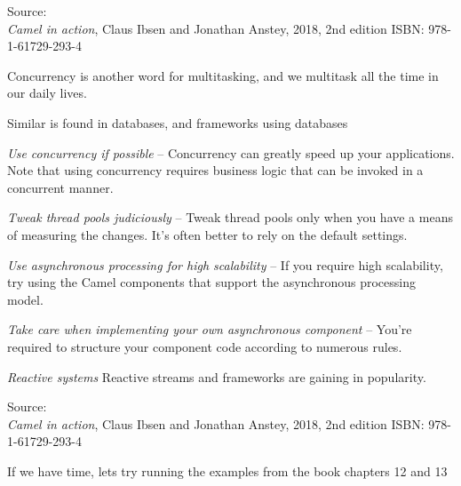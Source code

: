 \documentclass[Screen16to9,17pt]{foils}
\begin{document}
Source: {\footnotesize\\
\emph{Camel in action}, Claus Ibsen and Jonathan Anstey, 2018, 2nd edition
ISBN: 978-1-61729-293-4}


Concurrency is another word for multitasking, and we multitask all the time in our
daily lives.



\begin{list2}
  \item Similar is found in databases, and frameworks using databases
\end{list2}




\begin{list2}
\item \emph{Use concurrency if possible} -- Concurrency can greatly speed up your applications.
Note that using concurrency requires business logic that can be invoked in a concurrent manner.
\item \emph{Tweak thread pools judiciously} -- Tweak thread pools only when you have a means of measuring the changes. It’s often better to rely on the default settings.
\item \emph{Use asynchronous processing for high scalability} -- If you require high scalability, try using the Camel components that support the asynchronous processing model.
\item \emph{Take care when implementing your own asynchronous component} -- You’re required to
structure your component code according to numerous rules.
\item \emph{Reactive systems} Reactive streams and frameworks are gaining in popularity.
\end{list2}

Source: {\footnotesize\\
\emph{Camel in action}, Claus Ibsen and Jonathan Anstey, 2018, 2nd edition
ISBN: 978-1-61729-293-4}




\begin{list2}
\item If we have time, lets try running the examples from the book chapters 12 and 13
\end{list2}
\end{document}
